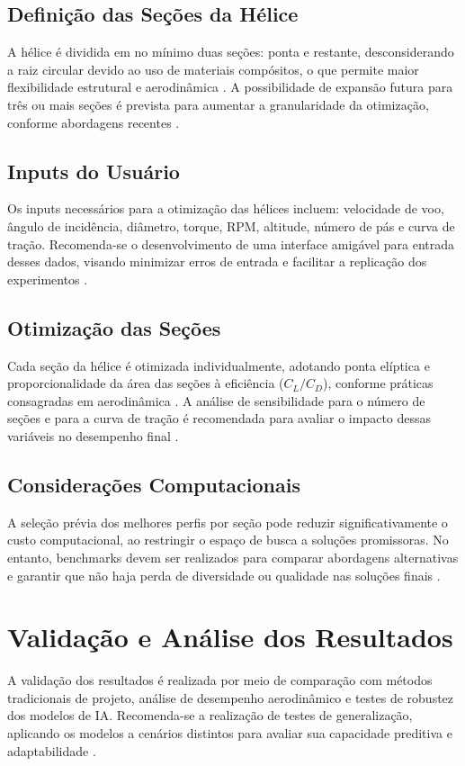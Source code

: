 \subsection{Definição das Seções da Hélice}
A hélice é dividida em no mínimo duas seções: ponta e restante, desconsiderando a raiz circular devido ao uso de materiais compósitos, o que permite maior flexibilidade estrutural e aerodinâmica \cite{raymer2018aircraft}. A possibilidade de expansão futura para três ou mais seções é prevista para aumentar a granularidade da otimização, conforme abordagens recentes \cite{wu2024}.

\subsection{Inputs do Usuário}
Os inputs necessários para a otimização  das hélices incluem: velocidade de voo, ângulo de incidência, diâmetro, torque, RPM, altitude, número de pás e curva de tração. Recomenda-se o desenvolvimento de uma interface amigável para entrada desses dados, visando minimizar erros de entrada e facilitar a replicação dos experimentos \cite{wu2024, raymer2018aircraft}.

\subsection{Otimização das Seções}
Cada seção da hélice é otimizada individualmente, adotando ponta elíptica e proporcionalidade da área das seções à eficiência (\(C_L/C_D\)), conforme práticas consagradas em aerodinâmica \cite{anderson2017fundamentals, abbott1959theory}. A análise de sensibilidade para o número de seções e para a curva de tração é recomendada para avaliar o impacto dessas variáveis no desempenho final \cite{wu2024}.

\subsection{Considerações Computacionais}
A seleção prévia dos melhores perfis por seção pode reduzir significativamente o custo computacional, ao restringir o espaço de busca a soluções promissoras. No entanto, benchmarks devem ser realizados para comparar abordagens alternativas e garantir que não haja perda de diversidade ou qualidade nas soluções finais \cite{oliveira2023, hasan2024}.

\section{Validação e Análise dos Resultados}
A validação dos resultados é realizada por meio de comparação com métodos tradicionais de projeto, análise de desempenho aerodinâmico e testes de robustez dos modelos de IA. Recomenda-se a realização de testes de generalização, aplicando os modelos a cenários distintos para avaliar sua capacidade preditiva e adaptabilidade \cite{hasan2024, wu2024, goodfellow2016deep}.

